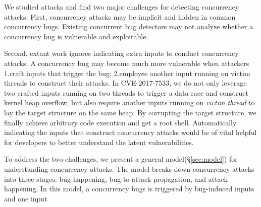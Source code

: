 We studied \nattacks attacks and find two major challenges for detecting concurrency attacks. 
First, concurrency attacks may be implicit and hidden in common concurrency bugs. 
Existing concurrent bug detectors may not 
analyze whether a concurrency bug is vulnerable and exploitable.  
%


Second, extant work ignores indicating extra inputs to conduct concurrency attacks.
A concurrency bug may become much more vulnerable when attackers 1.craft inputs that trigger the bug; 
2.employee another input running on victim threads to construct their attacks. 
In CVE-2017-7533, we do not only leverage two crafted inputs running on two threads to trigger a data race and construct kernel heap overflow, 
but also require another inputs running on \emph{victim thread} to lay the target structure on the same heap. 
By corrupting the target structure, we finally achieve arbitrary code execution and get a root shell. 
Automatically indicating the inputs that construct concurrency attacks 
would be of vital helpful for developers to better understand the latent vulnerabilities.


To address the two challenges, we present a general model(\S\ref{sec:model}) 
for understanding concurrency attacks.
The model breaks down concurrency attacks into three stages: bug happening, 
bug-to-attack propagation, and attack happening. In this model, 
a concurrency bugs is triggered by bug-induced inputs and one input 



